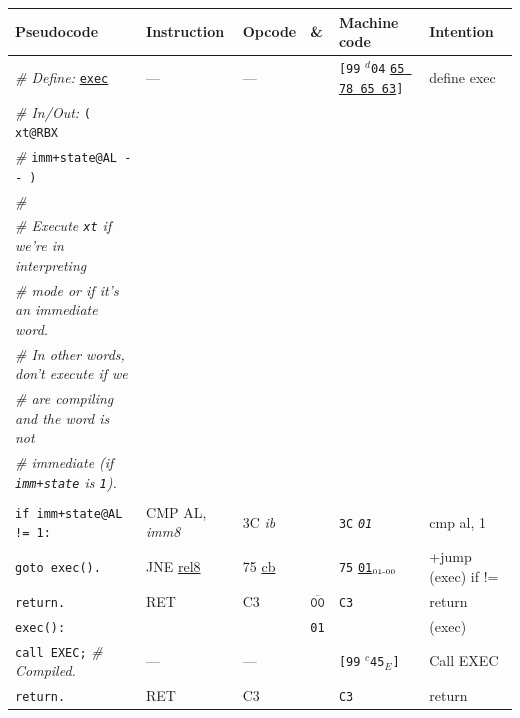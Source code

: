 \documentclass[a4paper,12pt,final]{article}
\begin{document}
\begin{table}[!htbp] \begin{adjustwidth}{-1cm}{-1cm} \fontsize{10}{12.000000}\selectfont
\begin{center}
\begin{tabular}{l|ll|l|lH}
\textbf{Pseudocode} & \textbf{Instruction} & \textbf{Opcode} & \textbf{\&} & \textbf{Machine code} & \textbf{Intention}\\[0pt]
\hline
\emph{\# Define:} \uline{\texttt{exec}} & --- & --- &  & \texttt{[99} \(^{d}\)​\texttt{04} \uline{\texttt{65 78 65 63}}​\texttt{]} & define exec\\[0pt]
\emph{\# In/Out:} \texttt{( xt@RBX} &  &  &  &  & \\[0pt]
\emph{\#}\hspace{4.9em}   \texttt{imm+state@AL -{}-{} )} &  &  &  &  & \\[0pt]
\emph{\#} &  &  &  &  & \\[0pt]
\emph{\# Execute \texttt{xt} if we're in interpreting} &  &  &  &  & \\[0pt]
\emph{\# mode or if it's an immediate word.} &  &  &  &  & \\[0pt]
\emph{\# In other words, don't execute if we} &  &  &  &  & \\[0pt]
\emph{\# are compiling and the word is not} &  &  &  &  & \\[0pt]
\emph{\# immediate (if \texttt{imm+state} is \texttt{1}).} &  &  &  &  & \\[0pt]
 &  &  &  &  & \\[0pt]
\hspace{1.053000em} \texttt{if imm+state@AL != 1:} & CMP AL, \emph{imm8} & 3C \emph{ib} &  & \texttt{3C} \emph{\texttt{01}} & cmp al, 1\\[0pt]
\hspace{2.106000em}   \texttt{goto exec().} & JNE \uline{rel8} & 75 \uline{cb} &  & \texttt{75} \uline{\texttt{01}}​\(_{\text{\tiny 01-00}}\) & +jump (exec) if !=\\[0pt]
\hspace{1.053000em} \texttt{return.} & RET & C3 & \(\overline{\texttt{00}}\) & \texttt{C3} & return\\[0pt]
\texttt{exec():} &  &  & \texttt{01} &  & (exec)\\[0pt]
\hspace{1.053000em} \texttt{call EXEC;}  \emph{\# Compiled.} & --- & --- &  & \texttt{[99} \(^{c}\)​\texttt{45}​\(_{E}\)​\texttt{]} & Call EXEC\\[0pt]
\hspace{1.053000em} \texttt{return.} & RET & C3 &  & \texttt{C3} & return\\[0pt]
\end{tabular}

\end{center}
\normalsize \end{adjustwidth} \end{table} \vspace{0}
\end{document}
